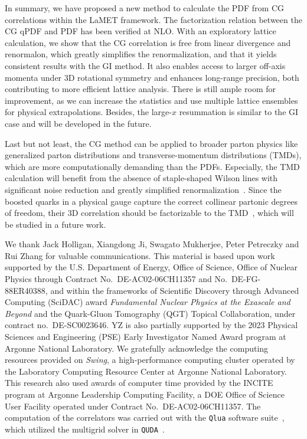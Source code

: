\documentclass[prd,twocolumn,preprintnumbers,showpacs,nofootinbib,superscriptaddress,notitlepage,floatfix]{revtex4-1}
\begin{document}
In summary, we have proposed a new method to calculate the PDF from CG correlations within the LaMET framework. The factorization relation between the CG qPDF and PDF has been verified at NLO. 
With an exploratory lattice calculation, we show that the CG correlation is free from linear divergence and renormalon, which greatly simplifies the renormalization, and that it yields consistent results with the GI method. It also enables access to larger off-axis momenta under 3D rotational symmetry and enhances long-range precision, both contributing to more efficient lattice analysis.
There is still ample room for improvement, as we can increase the statistics and use multiple lattice ensembles for physical extrapolations.
Besides, the large-$x$ resummation is similar to the GI case and will be developed in the future.

Last but not least, the CG method can be applied to broader parton physics like generalized parton distributions and transverse-momentum distributions (TMDs), which are more computationally demanding than the PDFs. Especially, the TMD calculation will benefit from the absence of staple-shaped Wilson lines with significant noise reduction and greatly simplified renormalization~\cite{Constantinou:2019vyb,Ebert:2019tvc,Shanahan:2019zcq,Green:2020xco,Ji:2021uvr,Zhang:2022xuw,Alexandrou:2023ucc}. Since the boosted quarks in a physical gauge capture the correct collinear partonic degrees of freedom, their 3D correlation should be factorizable to the TMD~\cite{Ebert:2018gzl,Ebert:2019okf,Ji:2019sxk,Ji:2019ewn,Ebert:2022fmh}, which will be studied in a future work.


\begin{acknowledgments}

We thank Jack Holligan, Xiangdong Ji, Swagato Mukherjee, Peter Petreczky and Rui Zhang for valuable communications.
This material is based upon work supported by the U.S. Department of Energy, Office of Science, Office of Nuclear Physics through Contract No.~DE-AC02-06CH11357 and No.~DE-FG-88ER40388, and within the frameworks of Scientific Discovery through Advanced Computing (SciDAC) award \textit{Fundamental Nuclear Physics at the Exascale and Beyond} and the Quark-Gluon Tomography (QGT) Topical Collaboration, under contract no.~DE-SC0023646. 
YZ is also partially supported by the 2023 Physical Sciences and Engineering (PSE) Early Investigator Named Award program at Argonne National Laboratory.
We gratefully acknowledge the computing resources provided on \textit{Swing}, a high-performance computing cluster operated by the Laboratory Computing Resource Center at Argonne National Laboratory.
This research also used awards of computer time provided by the INCITE program at Argonne Leadership Computing Facility, a DOE Office of Science User Facility operated under Contract No.~DE-AC02-06CH11357. 
The computation of the correlators was carried out with the \texttt{Qlua} software suite~\cite{qlua}, which utilized the multigrid solver in \texttt{QUDA}~\cite{Clark:2009wm,Babich:2011np}.

\end{acknowledgments}
 
\end{document}
